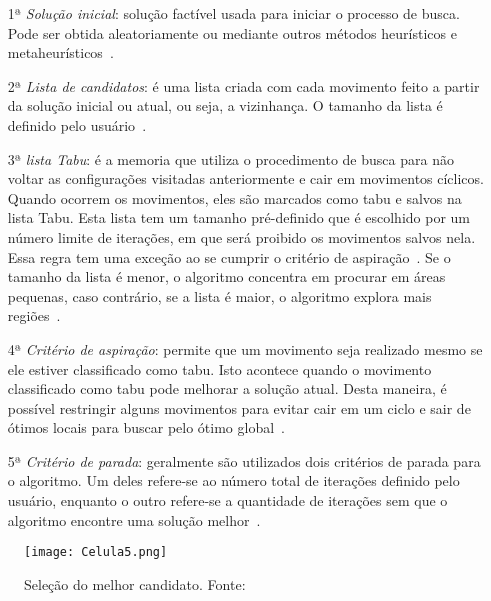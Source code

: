 \begin{enumerate}
\item[1ª] \textit{Solução inicial}: solução factível usada para iniciar o processo de busca. Pode ser obtida aleatoriamente ou mediante outros métodos heurísticos e metaheurísticos~\citep{glover1990tabu}.

\item[2ª] \textit{Lista de candidatos}: é uma lista criada com cada movimento feito a partir da solução inicial ou atual, ou seja, a vizinhança. O tamanho da lista é definido pelo usuário~\citep{glover1990tabu}. 

\item[3ª] \textit{lista Tabu}: é a memoria que utiliza o procedimento de busca para não voltar as configurações visitadas anteriormente e cair em movimentos cíclicos. Quando ocorrem os movimentos, eles são marcados como tabu e salvos na lista Tabu. Esta lista tem um tamanho pré-definido que é escolhido por um número limite de iterações, em que será proibido os movimentos salvos nela. Essa regra tem uma exceção ao se cumprir o critério de aspiração~\citep{glover1990tabu}. Se o tamanho da lista é menor, o algoritmo concentra em procurar em áreas pequenas, caso contrário, se a lista é maior, o algoritmo explora mais regiões~\citep{bozorgi2015tabu}. 

\item[4ª] \textit{Critério de aspiração}: permite que um movimento seja realizado mesmo se ele estiver classificado como tabu. Isto acontece quando o movimento classificado como tabu pode melhorar a solução atual. Desta maneira, é possível restringir alguns movimentos para evitar cair em um ciclo e sair de ótimos locais para buscar pelo ótimo global~\citep{bozorgi2015tabu}.

\item[5ª] \textit{Critério de parada}: geralmente são utilizados dois critérios de parada para o algoritmo. Um deles refere-se ao número total de iterações definido pelo usuário, enquanto o outro refere-se a quantidade de iterações sem que o algoritmo encontre uma solução melhor~\citep{glover1990tabu}. 
\end{enumerate}

\begin{figure}[t]
\begin{center}
\texttt{[image: Celula5.png]}
\caption{Seleção do melhor candidato. Fonte:~\cite{glover1990tabu}}\label{fig:05}
\end{center}
\end{figure}



